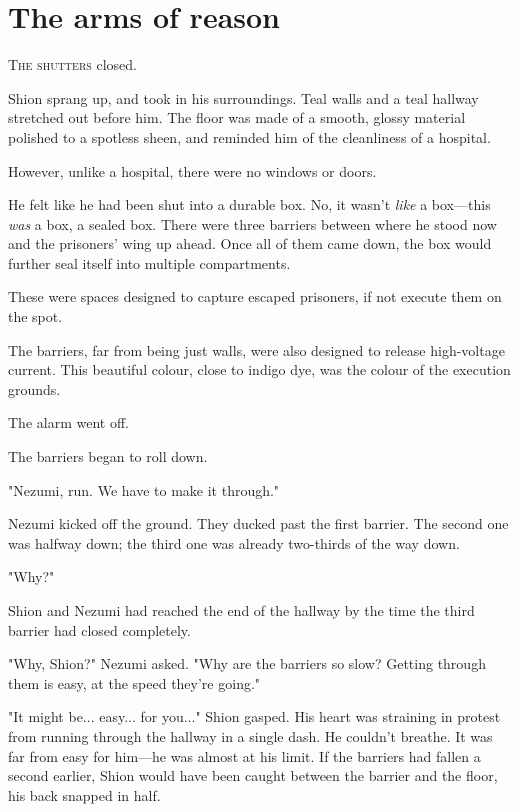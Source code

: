 
\chapter{The arms of reason}


\lettrine{T}{he shutters} closed.

Shion sprang up, and took in his surroundings. Teal walls and a teal
hallway stretched out before him. The floor was made of a smooth, glossy
material polished to a spotless sheen, and reminded him of the
cleanliness of a hospital.

However, unlike a hospital, there were no windows or doors.

He felt like he had been shut into a durable box. No, it wasn't \emph{like} a
box---this \emph{was} a box, a sealed box. There were three barriers between
where he stood now and the prisoners' wing up ahead. Once all of them
came down, the box would further seal itself into multiple compartments.

These were spaces designed to capture escaped prisoners, if not execute
them on the spot.

The barriers, far from being just walls, were also designed to release
high-voltage current. This beautiful colour, close to indigo dye, was
the colour of the execution grounds.

The alarm went off.

The barriers began to roll down.

"Nezumi, run. We have to make it through."

Nezumi kicked off the ground. They ducked past the first barrier. The
second one was halfway down; the third one was already two-thirds of the
way down.

"Why?"

Shion and Nezumi had reached the end of the hallway by the time the
third barrier had closed completely.

"Why, Shion?" Nezumi asked. "Why are the barriers so slow? Getting
through them is easy, at the speed they're going."

"It might be... easy... for you..." Shion gasped. His heart was
straining in protest from running through the hallway in a single dash.
He couldn't breathe. It was far from easy for him---he was almost at his
limit. If the barriers had fallen a second earlier, Shion would have
been caught between the barrier and the floor, his back snapped in half.

